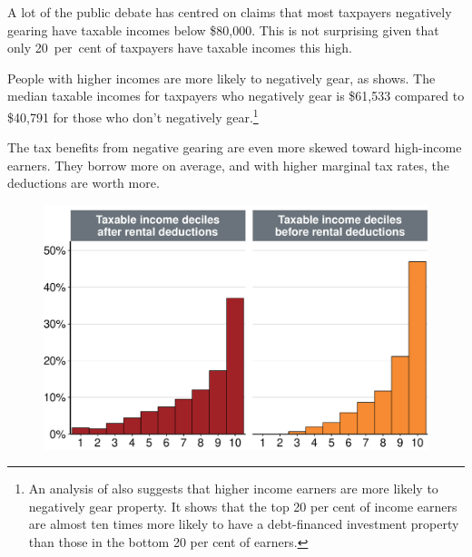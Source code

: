 A lot of the public debate has centred on claims that most taxpayers negatively gearing have taxable incomes below \$80,000. This is not surprising given that only 20~per~cent of taxpayers have taxable incomes this high. 

People with higher incomes are more likely to negatively gear, as  shows. The median taxable incomes for taxpayers who negatively gear is \$61,533 compared to \$40,791 for those who don’t negatively gear.\footnote{An \textcite{RBA2015SubmissionHomeOwnershipInquiry} analysis of \textcite{HILDA2015} also suggests that higher income earners are more likely to negatively gear property. It shows that the top 20 per cent of income earners are almost ten times more likely to have a debt-financed investment property than those in the bottom 20 per cent of earners.}

The tax benefits from negative gearing are even more skewed toward high-income earners. They borrow more on average, and with higher marginal tax rates, the deductions are worth more. 

\begin{figure}
\includegraphics[width=\columnwidth]{CGT-NG-atlas//Benefit-NG-before-after-deductions-1}

\end{figure}

